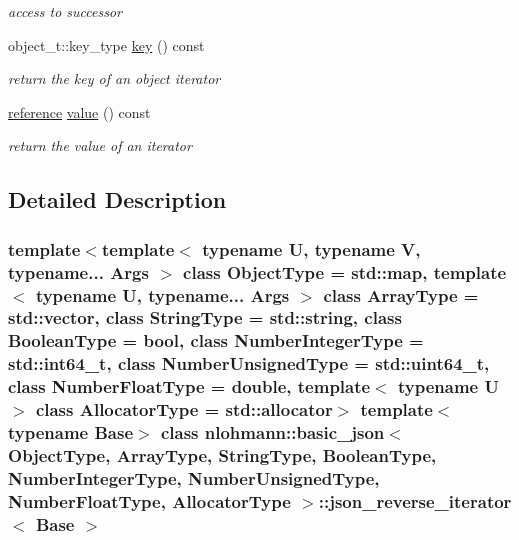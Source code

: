 \begin{DoxyCompactItemize}
\begin{DoxyCompactList}\small\item\em access to successor \end{DoxyCompactList}\item 
\hypertarget{classnlohmann_1_1basic__json_1_1json__reverse__iterator_a2f5d8a81d607f9222d1ade23f24cc093}{}\label{classnlohmann_1_1basic__json_1_1json__reverse__iterator_a2f5d8a81d607f9222d1ade23f24cc093} 
object\+\_\+t\+::key\+\_\+type \hyperlink{classnlohmann_1_1basic__json_1_1json__reverse__iterator_a2f5d8a81d607f9222d1ade23f24cc093}{key} () const
\begin{DoxyCompactList}\small\item\em return the key of an object iterator \end{DoxyCompactList}\item 
\hypertarget{classnlohmann_1_1basic__json_1_1json__reverse__iterator_af1c8b1f3be60159ae0829938a4e674fa}{}\label{classnlohmann_1_1basic__json_1_1json__reverse__iterator_af1c8b1f3be60159ae0829938a4e674fa} 
\hyperlink{classnlohmann_1_1basic__json_1_1json__reverse__iterator_a7265535f39299824f9712a2ca15013c3}{reference} \hyperlink{classnlohmann_1_1basic__json_1_1json__reverse__iterator_af1c8b1f3be60159ae0829938a4e674fa}{value} () const
\begin{DoxyCompactList}\small\item\em return the value of an iterator \end{DoxyCompactList}\end{DoxyCompactItemize}


\subsection{Detailed Description}
\subsubsection*{template$<$template$<$ typename U, typename V, typename... Args $>$ class Object\+Type = std\+::map, template$<$ typename U, typename... Args $>$ class Array\+Type = std\+::vector, class String\+Type = std\+::string, class Boolean\+Type = bool, class Number\+Integer\+Type = std\+::int64\+\_\+t, class Number\+Unsigned\+Type = std\+::uint64\+\_\+t, class Number\+Float\+Type = double, template$<$ typename U $>$ class Allocator\+Type = std\+::allocator$>$\newline
template$<$typename Base$>$\newline
class nlohmann\+::basic\+\_\+json$<$ Object\+Type, Array\+Type, String\+Type, Boolean\+Type, Number\+Integer\+Type, Number\+Unsigned\+Type, Number\+Float\+Type, Allocator\+Type $>$\+::json\+\_\+reverse\+\_\+iterator$<$ Base $>$}

